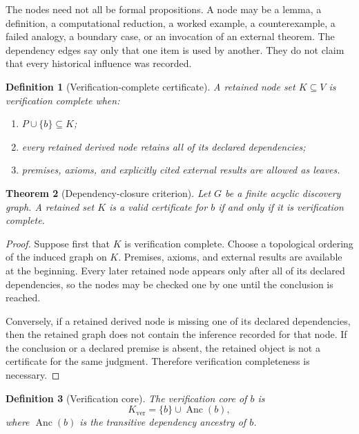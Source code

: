 \documentclass[11pt,oneside]{book}
\newtheorem{definition}{Definition}[chapter]
\newtheorem{theorem}[definition]{Theorem}
\theoremstyle{remark}
\begin{document}
The nodes need not all be formal propositions.  A node may be a lemma, a definition, a computational reduction, a worked example, a counterexample, a failed analogy, a boundary case, or an invocation of an external theorem.  The dependency edges say only that one item is used by another.  They do not claim that every historical influence was recorded.

\begin{definition}[Verification-complete certificate]
A retained node set \(K\subseteq V\) is verification complete when:
\begin{enumerate}[label=\textup{(\roman*)}]
\item \(P\cup\{b\}\subseteq K\);
\item every retained derived node retains all of its declared dependencies;
\item premises, axioms, and explicitly cited external results are allowed as leaves.
\end{enumerate}
\end{definition}

\begin{theorem}[Dependency-closure criterion]
Let \(G\) be a finite acyclic discovery graph.  A retained set \(K\) is a valid certificate for \(b\) if and only if it is verification complete.
\end{theorem}

\begin{proof}
Suppose first that \(K\) is verification complete.  Choose a topological ordering of the induced graph on \(K\).  Premises, axioms, and external results are available at the beginning.  Every later retained node appears only after all of its declared dependencies, so the nodes may be checked one by one until the conclusion is reached.

Conversely, if a retained derived node is missing one of its declared dependencies, then the retained graph does not contain the inference recorded for that node.  If the conclusion or a declared premise is absent, the retained object is not a certificate for the same judgment.  Therefore verification completeness is necessary.
\end{proof}

\begin{definition}[Verification core]
The verification core of \(b\) is
\[
K_{\mathrm{ver}}
=
\{b\}\cup\operatorname{Anc}(b),
\]
where \(\operatorname{Anc}(b)\) is the transitive dependency ancestry of \(b\).
\end{definition}
\end{document}
